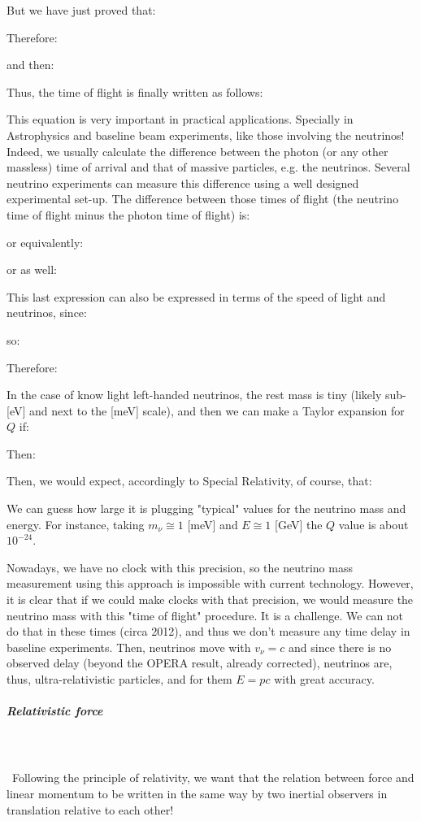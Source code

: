	But we have just proved that:
	
 	Therefore:
 	
	and then:
 	
	Thus, the time of flight is finally written as follows:
 	
	This equation is very important in practical applications. Specially in Astrophysics and baseline beam experiments, like those involving the neutrinos! Indeed, we usually calculate the difference between the photon (or any other massless) time of arrival and that of massive particles, e.g. the neutrinos. Several neutrino experiments can measure this difference using a well designed experimental set-up. The difference between those times of flight (the neutrino time of flight minus the photon time of flight) is:
	
	or equivalently:
 	
	or as well:
 	
	This last expression can also be expressed in terms of the speed of light and neutrinos, since:
	
	so:
	
 	Therefore:
 	
	In the case of know light left-handed neutrinos, the rest mass is tiny (likely sub-[eV] and next to the [meV] scale), and then we can make a Taylor expansion for $Q$ if:
 	
	Then:
	
	Then, we would expect, accordingly to Special Relativity, of course, that:
	
 	We can guess how large it is plugging "typical" values for the neutrino mass and energy. For instance, taking $m_\nu\cong 1$ [meV] and $E\cong 1$ [GeV]  the $Q$ value is about $10^{-24}$.
 
	Nowadays, we have no clock with this precision, so the neutrino mass measurement using this approach is impossible with current technology. However, it is clear that if we could make clocks with that precision, we would measure the neutrino mass with this "time of flight" procedure. It is a challenge. We can not do that in these times (circa 2012), and thus we don't measure any time delay in baseline experiments. Then, neutrinos move with $v_\nu=c$ and since there is no observed delay (beyond the OPERA result, already corrected), neutrinos are, thus, ultra-relativistic particles, and for them $E=pc$ with great accuracy.
	
	\subparagraph{Relativistic force}\mbox{}\\\\\
	Following the principle of relativity, we want that the relation between force and linear momentum to be written in the same way by two inertial observers in translation relative to each other!

